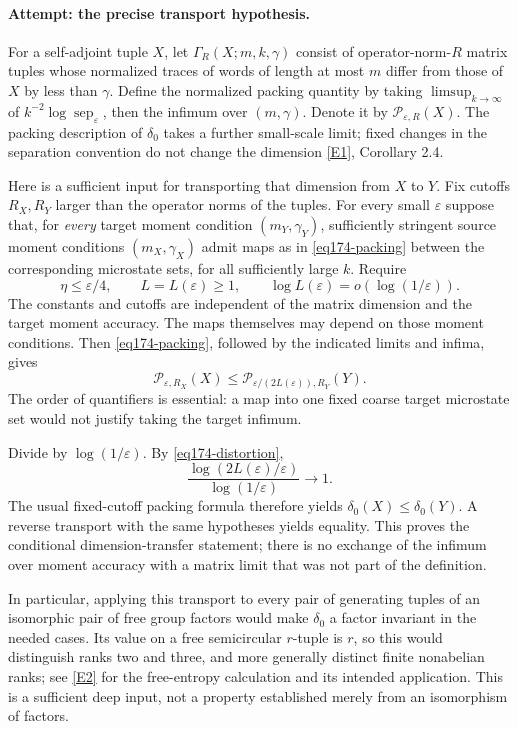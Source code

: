 \documentclass[11pt,a4paper]{article}
\newcommand{\eps}{\varepsilon}
\newcommand{\eref}[2]{\hyperlink{extra:#1:#2}{[E#2]}}
\numberwithin{equation}{section}
\begin{document}
\paragraph{Attempt: the precise transport hypothesis.}
For a self-adjoint tuple $X$, let $\Gamma_R(X;m,k,\gamma)$ consist of
operator-norm-$R$ matrix tuples whose normalized traces of words of length
at most $m$ differ from those of $X$ by less than $\gamma$.
Define the normalized packing quantity by taking $\limsup_{k\to\infty}$
of $k^{-2}\log\operatorname{sep}_\eps$, then the infimum over
$(m,\gamma)$. Denote it by $\mathcal P_{\eps,R}(X)$.
The packing description of $\delta_0$ takes a further small-scale limit;
fixed changes in the separation convention do not change the dimension
\eref{30001752}{1}, Corollary 2.4.

Here is a sufficient input for transporting that dimension from $X$ to
$Y$. Fix cutoffs $R_X,R_Y$ larger than the operator norms of the tuples.
For every small $\eps$ suppose that, for \emph{every} target moment
condition $(m_Y,\gamma_Y)$, sufficiently stringent source moment conditions
$(m_X,\gamma_X)$ admit maps as in \eqref{eq174-packing} between the
corresponding microstate sets, for all sufficiently large $k$. Require
\begin{equation}\label{eq174-distortion}
 \eta\le\eps/4,\qquad L=L(\eps)\ge1,
 \qquad \log L(\eps)=o(\log(1/\eps)).
\end{equation}
The constants and cutoffs are independent of the matrix dimension and the
target moment accuracy. The maps themselves may depend on those moment
conditions. Then \eqref{eq174-packing}, followed by the indicated limits
and infima, gives
\begin{equation}\label{eq174-entropy}
 \mathcal P_{\eps,R_X}(X)
       \le \mathcal P_{\eps/(2L(\eps)),R_Y}(Y).
\end{equation}
The order of quantifiers is essential: a map into one fixed coarse target
microstate set would not justify taking the target infimum.

Divide by $\log(1/\eps)$. By \eqref{eq174-distortion},
\[
 \frac{\log(2L(\eps)/\eps)}{\log(1/\eps)}\longrightarrow1.
\]
The usual fixed-cutoff packing formula therefore yields
$\delta_0(X)\le\delta_0(Y)$. A reverse transport with the same hypotheses
yields equality. This proves the conditional dimension-transfer statement;
there is no exchange of the infimum over moment accuracy with a matrix
limit that was not part of the definition.

In particular, applying this transport to every pair of generating tuples
of an isomorphic pair of free group factors would make $\delta_0$ a factor
invariant in the needed cases. Its value on a free semicircular $r$-tuple
is $r$, so this would distinguish ranks two and three, and more generally
distinct finite nonabelian ranks; see \eref{30001752}{2} for the free-entropy
calculation and its intended application. This is a sufficient deep input,
not a property established merely from an isomorphism of factors.
\end{document}
